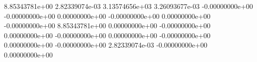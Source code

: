  8.85343781e+00
 2.82339074e-03
 3.13574656e+03
 3.26093677e-03
 -0.00000000e+00
 -0.00000000e+00
 0.00000000e+00
 -0.00000000e+00
 0.00000000e+00
 -0.00000000e+00
 8.85343781e+00
 0.00000000e+00
 -0.00000000e+00
 0.00000000e+00
 -0.00000000e+00
 0.00000000e+00
 -0.00000000e+00
 0.00000000e+00
 -0.00000000e+00
 2.82339074e-03
 -0.00000000e+00
 0.00000000e+00
